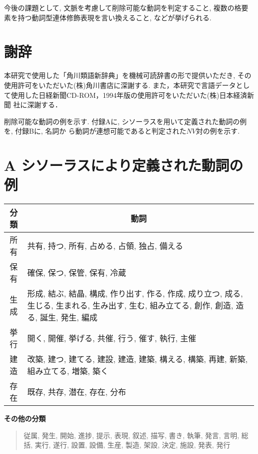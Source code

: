 今後の課題として, 文脈を考慮して削除可能な動詞を判定すること,
複数の格要素を持つ動詞型連体修飾表現を言い換えること, などが挙げられる.


\section*{謝辞}
本研究で使用した「角川類語新辞典」を機械可読辞書の形で提供いただき, その
使用許可をいただいた(株)角川書店に深謝する. また，本研究で言語データとし
て使用した日経新聞CD-ROM，1994年版の使用許可をいただいた(株)日本経済新聞
社に深謝する．

\appendix
削除可能な動詞の例を示す.
付録Aに, シソーラスを用いて定義された動詞の例を, 付録Bに, 名詞か
ら動詞が連想可能であると判定された$NV対$の例を示す.
\section*{A シソーラスにより定義された動詞の例} \label{a}
\begin{center}
\begin{tabular}{|c|p{10cm}|}
 \hline
分類 &\multicolumn{1}{c|}{動詞}\\
 \hline
 \hline
 所有 & 共有,  持つ,  所有,  占める,  占領,  独占,  備える \\
 \hline
 \hline
 保有 & 確保,  保つ,  保管,  保有, 冷蔵\\
 \hline
 \hline
 生成 & 形成,  結ぶ,  結晶, 構成,  作り出す, 作る, 作成,
 成り立つ, 成る,  生じる, 生まれる,  生み出す,  生む, 組み立てる, 創作, 
 創造,  造る, 誕生,  発生,  編成 \\
 \hline
 \hline
 挙行 & 開く,  開催,  挙げる,  共催,  行う,  催す,  執行,  主催\\
\hline
\hline
建造 & 改築,  建つ,  建てる,  建設,  建造,  建築,  構える,  構築, 
 再建,  新築, 組み立てる,  増築,  築く\\
\hline
\hline
存在 & 既存,  共存,  潜在,  存在,  分布\\
 \hline
\end{tabular}
\end{center}

\vspace{0.5cm}
\noindent
{\bf その他の分類}
\begin{quote}
従属, 発生, 開始, 進捗, 提示, 表現, 叙述, 描写, 書き, 執筆, 
発言, 言明, 総括, 実行, 遂行, 設置, 設備, 生産, 製造, 架設, 
決定, 施設, 発表, 発行
\end{quote}


